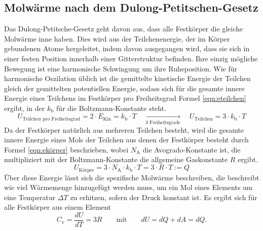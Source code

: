 \documentclass[titlepage = firstcover]{scrartcl}
\begin{document}
        \subsection{Molwärme nach dem Dulong-Petitschen-Gesetz}
            Das Dulong-Petitsche-Gesetz geht davon aus, dass alle Festkörper die gleiche Molwärme inne haben. Dies wird aus der
            Teilchenenergie, der im Körper gebundenen Atome hergeleitet, indem davon ausgegangen wird, dass sie sich in einer festen Position
            innerhalb einer Gitterstruktur befinden. Ihre einzig mögliche Bewegung ist eine harmonische Schwingung um ihre Ruheposition. Wie für
            harmonische Oszilation üblich ist die gemittelte kinetische Energie der Teilchen gleich der gemittelten potentiellen Energie, sodass sich für die gesamte innere Energie eines 
            Teilchens im Festkörper pro Freiheitsgrad Formel \eqref{eqn:eteilchen} ergibt, in der $k_{\text{b}}$ für die Boltzmann-Konstante steht.
            \begin{equation}
                U_{\text{Teilchen pro Freiheitsgrad}} = 2 \cdot E_{\text{Kin}} = k_{\text{b}} \cdot T \quad \xrightarrow[\text{3 Freiheitsgrade}]{} \quad U_{\text{Teilchen}} = 3 \cdot k_{\text{b}} \cdot T
                \label{eqn:eteilchen}
            \end{equation} 
            Da der Festkörper natürlich aus mehreren Teilchen besteht, wird die gesamte innere Energie eines Mols der Teilchen aus denen der Festkörper besteht durch Formel \eqref{eqn:ekörper} beschrieben, 
            wobei $N_{\text{A}}$ die Avogrado-Konstante ist, die multipliziert mit der Boltzmann-Konstante die allgemeine Gaskonstante $R$ ergibt. 
            \begin{equation}
                U_{\text{Körper}} = 3 \cdot N_{\text{A}} \cdot k_{\text{b}} \cdot T = 3 \cdot R \cdot T := Q
                \label{eqn:ekörper}
            \end{equation}
            Über diese Energie lässt sich die spezifische Molwärme beschreiben, die beschreibt wie viel Wärmemenge hinzugefügt werden muss, um ein Mol eines
            Elements um eine Temperatur $\Delta T$ zu erhitzen, sofern der Druck konstant ist. Es ergibt sich für alle Festkörper aus einem Element
            \begin{equation}
                C_{\text{v}} = \frac{dU}{dT} = 3R \qquad \text{mit} \qquad dU = dQ + dA = dQ .
            \end{equation}
            
\end{document}
